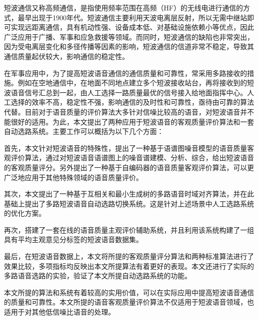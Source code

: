 \begin{cabstract}

  短波通信又称高频通信，是指使用频率范围在高频（HF）的无线电进行通信的方式，最早出现于1900年代。短波通信主要利用天波电离层反射，所以无需中继站即可实现远距离通信，具有机动性强、设备成本低、对基础设施依赖小等优点，因此广泛应用于广播、军事和应急救援等领域。而同时，短波通信的缺陷也非常突出，因为受电离层变化和多径传播等因素的影响，短波通信的信道非常不稳定，导致其通信质量起伏较大，影响通信的稳定性。
  
  在军事应用中，为了提高短波语音通信的通信质量和可靠性，常采用多路接收的措施。例如在空地通信中，在地面不同地点建立多个短波接收站台，再将接收到的短波语音信号汇总到一起，由人工选择一路质量最优的信号接入给地面指挥中心。人工选择的效率不高，稳定性不强，影响通信的及时性和可靠性，亟待由可靠的算法代替。目前对于语音质量的评价算法大多针对信噪比较高的语音，对短波语音并不能很好的适用。为此，本文提出了两种应用于短波语音的客观质量评价算法和一套自动选路系统。主要工作可以概括为以下几个方面：

  首先，本文针对短波语音的特殊性，提出了一种基于语谱图噪音模型的语音质量客观评价算法，通过对短波语音语谱图上的噪音谱建模、分析、综合，给出短波语音的客观质量评分。另外提出了一种基于自编码器的语音质量客观评价算法，可以更广泛地应用于其他特殊领域的语音质量评价。

  其次，本文提出了一种基于互相关和最小生成树的多路语音时域对齐算法，并在此基础上提出了多路短波语音自动选路切换系统。这是针对上述场景中人工选路系统的优化方案。

  再次，搭建了一套在线的语音质量主观评价辅助系统，并且利用该系统构建了一组具有平均主观意见分标签的短波语音数据集。

  最后，在短波语音数据上，本文将所提的客观质量评分算法和两种标准算法进行了效果比较，多项指标均反映出本文所提算法有着更好的表现。本文还进行了实际的多路语音选路的实验，验证了本文所提自动选路系统的功能。

  本文所提的算法和系统有着较高的实用价值，可以在实际应用中提高短波语音通信的质量和可靠性。本文所提的语音客观质量评价算法不仅适用于短波语音领域，也适用于对其他低信噪比语音的处理。

\end{cabstract}


